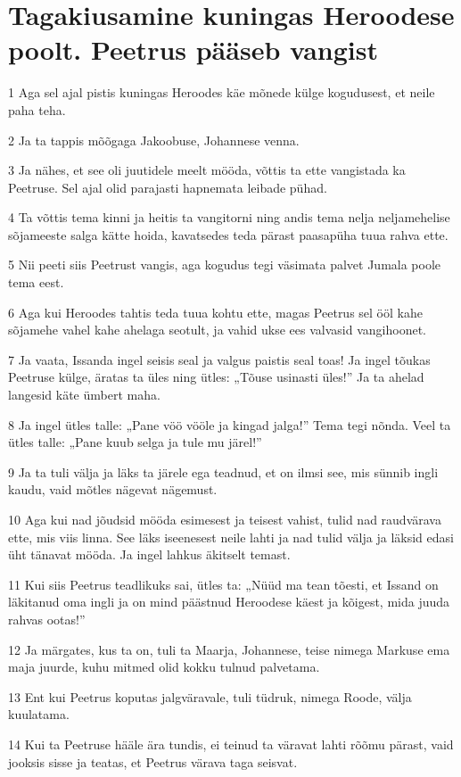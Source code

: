 \section*{Tagakiusamine kuningas Heroodese poolt. Peetrus pääseb vangist}

\par 1 Aga sel ajal pistis kuningas Heroodes käe mõnede külge kogudusest, et neile paha teha.
\par 2 Ja ta tappis mõõgaga Jakoobuse, Johannese venna.
\par 3 Ja nähes, et see oli juutidele meelt mööda, võttis ta ette vangistada ka Peetruse. Sel ajal olid parajasti hapnemata leibade pühad.
\par 4 Ta võttis tema kinni ja heitis ta vangitorni ning andis tema nelja neljamehelise sõjameeste salga kätte hoida, kavatsedes teda pärast paasapüha tuua rahva ette.
\par 5 Nii peeti siis Peetrust vangis, aga kogudus tegi väsimata palvet Jumala poole tema eest.
\par 6 Aga kui Heroodes tahtis teda tuua kohtu ette, magas Peetrus sel ööl kahe sõjamehe vahel kahe ahelaga seotult, ja vahid ukse ees valvasid vangihoonet.
\par 7 Ja vaata, Issanda ingel seisis seal ja valgus paistis seal toas! Ja ingel tõukas Peetruse külge, äratas ta üles ning ütles: „Tõuse usinasti üles!” Ja ta ahelad langesid käte ümbert maha.
\par 8 Ja ingel ütles talle: „Pane vöö vööle ja kingad jalga!” Tema tegi nõnda. Veel ta ütles talle: „Pane kuub selga ja tule mu järel!”
\par 9 Ja ta tuli välja ja läks ta järele ega teadnud, et on ilmsi see, mis sünnib ingli kaudu, vaid mõtles nägevat nägemust.
\par 10 Aga kui nad jõudsid mööda esimesest ja teisest vahist, tulid nad raudvärava ette, mis viis linna. See läks iseenesest neile lahti ja nad tulid välja ja läksid edasi üht tänavat mööda. Ja ingel lahkus äkitselt temast.
\par 11 Kui siis Peetrus teadlikuks sai, ütles ta: „Nüüd ma tean tõesti, et Issand on läkitanud oma ingli ja on mind päästnud Heroodese käest ja kõigest, mida juuda rahvas ootas!”
\par 12 Ja märgates, kus ta on, tuli ta Maarja, Johannese, teise nimega Markuse ema maja juurde, kuhu mitmed olid kokku tulnud palvetama.
\par 13 Ent kui Peetrus koputas jalgväravale, tuli tüdruk, nimega Roode, välja kuulatama.
\par 14 Kui ta Peetruse hääle ära tundis, ei teinud ta väravat lahti rõõmu pärast, vaid jooksis sisse ja teatas, et Peetrus värava taga seisvat.
